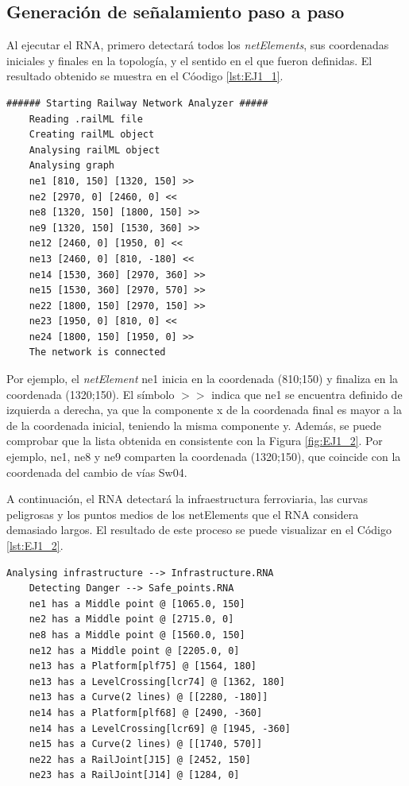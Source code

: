 \subsection{Generación de señalamiento paso a paso}

	Al ejecutar el RNA, primero detectará todos los \textit{netElements}, sus coordenadas iniciales y finales en la topología, y el sentido en el que fueron definidas. El resultado obtenido se muestra en el Cóodigo \ref{lst:EJ1_1}.
	
	\begin{lstlisting}[language = {}, caption = Detección de \textit{netElements} por parte del RNA , label = {lst:EJ1_1}]
	###### Starting Railway Network Analyzer #####
	Reading .railML file
	Creating railML object
	Analysing railML object
	Analysing graph
	ne1 [810, 150] [1320, 150] >>
	ne2 [2970, 0] [2460, 0] <<
	ne8 [1320, 150] [1800, 150] >>
	ne9 [1320, 150] [1530, 360] >>
	ne12 [2460, 0] [1950, 0] <<
	ne13 [2460, 0] [810, -180] <<
	ne14 [1530, 360] [2970, 360] >>
	ne15 [1530, 360] [2970, 570] >>
	ne22 [1800, 150] [2970, 150] >>
	ne23 [1950, 0] [810, 0] <<
	ne24 [1800, 150] [1950, 0] >>
	The network is connected
	\end{lstlisting}
	
	Por ejemplo, el \textit{netElement} ne1 inicia en la coordenada (810;150) y finaliza en la coordenada (1320;150). El símbolo $>>$ indica que ne1 se encuentra definido de izquierda a derecha, ya que la componente x de la coordenada final es mayor a la de la coordenada inicial, teniendo la misma componente y. Además, se puede comprobar que la lista obtenida en consistente con la Figura \ref{fig:EJ1_2}. Por ejemplo, ne1, ne8 y ne9 comparten la coordenada (1320;150), que coincide con la coordenada del cambio de vías Sw04.
	
	A continuación, el RNA detectará la infraestructura ferroviaria, las curvas peligrosas y los puntos medios de los netElements que el RNA considera demasiado largos. El resultado de este proceso se puede visualizar en el Código \ref{lst:EJ1_2}.
	
	\begin{lstlisting}[language = {}, caption = Detección de puntos críticos por parte del RNA , label = {lst:EJ1_2}]
	Analysing infrastructure --> Infrastructure.RNA
	Detecting Danger --> Safe_points.RNA
	ne1 has a Middle point @ [1065.0, 150]
	ne2 has a Middle point @ [2715.0, 0]
	ne8 has a Middle point @ [1560.0, 150]
	ne12 has a Middle point @ [2205.0, 0]
	ne13 has a Platform[plf75] @ [1564, 180]
	ne13 has a LevelCrossing[lcr74] @ [1362, 180]
	ne13 has a Curve(2 lines) @ [[2280, -180]]
	ne14 has a Platform[plf68] @ [2490, -360]
	ne14 has a LevelCrossing[lcr69] @ [1945, -360]
	ne15 has a Curve(2 lines) @ [[1740, 570]]
	ne22 has a RailJoint[J15] @ [2452, 150]
	ne23 has a RailJoint[J14] @ [1284, 0]
	\end{lstlisting}
	
